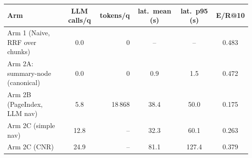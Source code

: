 \begin{tabular}{l S[table-format=1.1] r S[table-format=2.1] S[table-format=2.1] S[table-format=1.3]}
\toprule
Arm & {LLM calls/q} & {tokens/q} & {lat.\ mean (s)} & {lat.\ p95 (s)} & {E/R@10} \\
\midrule
Arm 1 (Naive, RRF over chunks) & 0.0 & 0 & {--} & {--} & 0.483 \\
Arm 2A: summary-node (canonical) & 0.0 & 0 & {0.9} & {1.5} & 0.472 \\
Arm 2B (PageIndex, LLM nav) & 5.8 & 18\,868 & {38.4} & {50.0} & 0.175 \\
Arm 2C (simple nav) & 12.8 & -- & {32.3} & {60.1} & 0.263 \\
Arm 2C (CNR) & 24.9 & -- & {81.1} & {127.4} & 0.379 \\
\bottomrule
\end{tabular}
